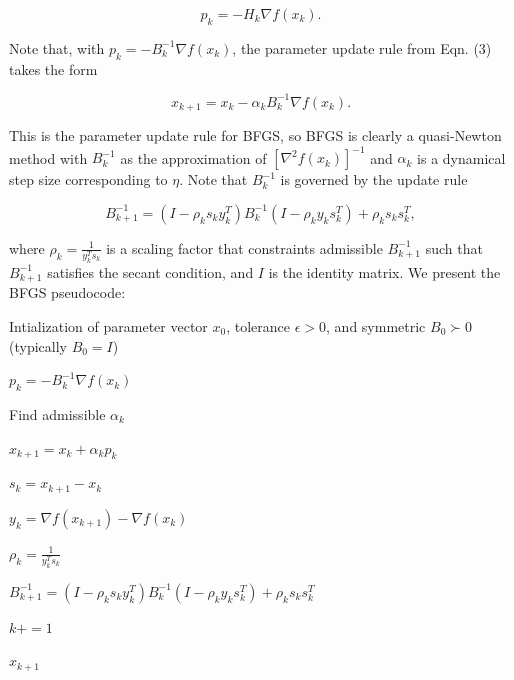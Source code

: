 \documentclass[twoside,11pt]{article}
\begin{document}
\begin{equation}
p_k = -H_k\nabla f(x_k).
\end{equation}

\noindent
Note that, with $p_k = -B_k^{-1}\nabla f(x_k)$, the parameter update rule from Eqn. (3) takes the form

\begin{equation}
x_{k+1} = x_k - \alpha_k B_k^{-1} \nabla f(x_k).
\end{equation}

\noindent
This is the parameter update rule for BFGS, so BFGS is clearly a quasi-Newton method with $B_k^{-1}$ as the approximation of $[\nabla^2 f(x_k)]^{-1}$ and $\alpha_k$ is a dynamical step size corresponding to $\eta$. Note that $B_k^{-1}$ is governed by the update rule

\begin{equation}
B_{k+1}^{-1} = (I - \rho_k s_k y_k^T)B_k^{-1}(I - \rho_k y_k s_k^T) + \rho_k s_k s_k^T,
\end{equation}

\noindent
where $\rho_k = \frac{1}{y_k^T s_k}$ is a scaling factor that constraints admissible $B_{k+1}^{-1}$ such that $B_{k+1}^{-1}$ satisfies the secant condition, and $I$ is the identity matrix. We present the BFGS pseudocode:

\begin{algorithm}[H]
\caption{Broyden-Fletcher-Goldfarb-Shanno (BFGS)}
\begin{algorithmic}

\Require Intialization of parameter vector $x_0$, tolerance $\epsilon > 0$, and symmetric $B_0 \succ 0$ (typically $B_0 = I$)

    \State $p_k = -B_k^{-1}\nabla f(x_k)$

    \State Find admissible $\alpha_k$

    \State $x_{k+1} = x_k + \alpha_k p_k$

    \State $s_k = x_{k+1} - x_k$

    \State $y_k = \nabla f(x_{k+1}) - \nabla f(x_k)$

    \State $\rho_k = \frac{1}{y_k^T s_k}$

    \State $B_{k+1}^{-1} = (I - \rho_k s_k y_k^T)B_k^{-1}(I - \rho_k y_k s_k^T) + \rho_k s_k s_k^T$

    \State $k += 1$
\EndWhile

\noindent
\Return $x_{k+1}$
\end{algorithmic}
\end{algorithm}
\end{document}
